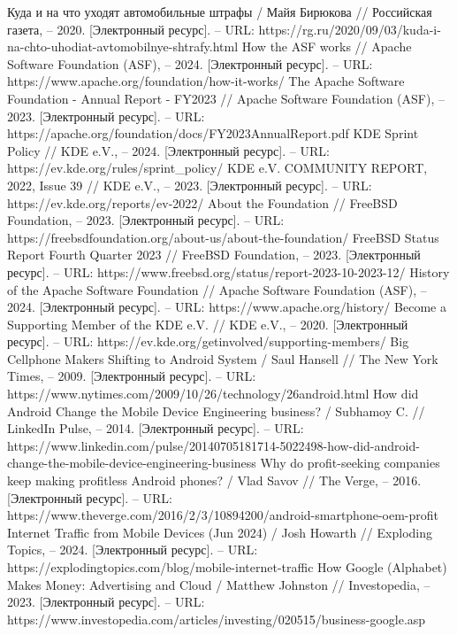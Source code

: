 \documentclass{article}
\begin{document}
\begin{thebibliography}{2}
 Куда и на что уходят автомобильные штрафы / Майя Бирюкова // Российская газета, – 2020. [Электронный ресурс]. – URL: https://rg.ru/2020/09/03/kuda-i-na-chto-uhodiat-avtomobilnye-shtrafy.html
 How the ASF works // Apache Software Foundation (ASF), – 2024. [Электронный ресурс]. – URL: https://www.apache.org/foundation/how-it-works/
 The Apache Software Foundation - Annual Report - FY2023 // Apache Software Foundation (ASF), – 2023. [Электронный ресурс]. – URL: https://apache.org/foundation/docs/FY2023AnnualReport.pdf
 KDE Sprint Policy // KDE e.V., – 2024. [Электронный ресурс]. – URL: https://ev.kde.org/rules/sprint\_policy/
 KDE e.V. COMMUNITY REPORT, 2022, Issue 39 // KDE e.V., – 2023. [Электронный ресурс]. – URL: https://ev.kde.org/reports/ev-2022/
 About the Foundation // FreeBSD Foundation, – 2023. [Электронный ресурс]. – URL: https://freebsdfoundation.org/about-us/about-the-foundation/
 FreeBSD Status Report Fourth Quarter 2023 // FreeBSD Foundation, – 2023. [Электронный ресурс]. – URL: https://www.freebsd.org/status/report-2023-10-2023-12/
 History of the Apache Software Foundation // Apache Software Foundation (ASF), – 2024. [Электронный ресурс]. – URL: https://www.apache.org/history/
 Become a Supporting Member of the KDE e.V. // KDE e.V., – 2020. [Электронный ресурс]. – URL: https://ev.kde.org/getinvolved/supporting-members/
 Big Cellphone Makers Shifting to Android System / Saul Hansell // The New York Times, – 2009. [Электронный ресурс]. – URL: https://www.nytimes.com/2009/10/26/technology/26android.html
 How did Android Change the Mobile Device Engineering business? / Subhamoy C. // LinkedIn Pulse, – 2014. [Электронный ресурс]. – URL: https://www.linkedin.com/pulse/20140705181714-5022498-how-did-android-change-the-mobile-device-engineering-business
 Why do profit-seeking companies keep making profitless Android phones? / Vlad Savov // The Verge, – 2016. [Электронный ресурс]. – URL: https://www.theverge.com/2016/2/3/10894200/android-smartphone-oem-profit
 Internet Traffic from Mobile Devices (Jun 2024) / Josh Howarth // Exploding Topics, – 2024. [Электронный ресурс]. – URL: https://explodingtopics.com/blog/mobile-internet-traffic
 How Google (Alphabet) Makes Money: Advertising and Cloud / Matthew Johnston // Investopedia, – 2023. [Электронный ресурс]. – URL: https://www.investopedia.com/articles/investing/020515/business-google.asp

\end{thebibliography}
\end{document}
